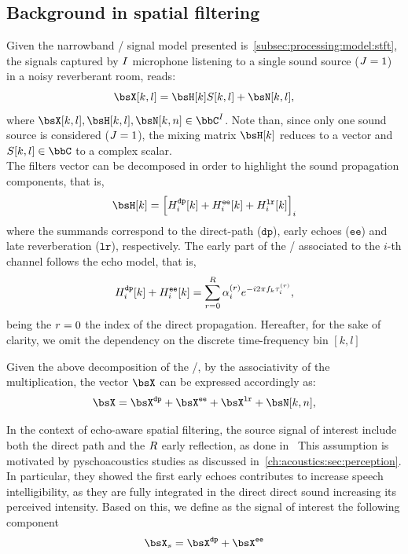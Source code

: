 \subsection{Background in spatial filtering}
Given the narrowband \STFT/ signal model presented is~\cref{subsec:processing:model:stft}, the signals captured by $I$ microphone listening to a single sound source ($J=1$) in a noisy reverberant room, reads:
\begin{equation}
    \MICS[k,l] = \FLTS[k] \SRC[k, l]+ \NSES[k,l]
    ,
\end{equation}
where $\MICS[k,l], \FLTS[k,l], \NSES[k,n] \in \bbC^{\numMics}$.
Note than, since only one sound source is considered ($J=1$), the mixing matrix $\FLTS[k]$ reduces to a vector and $\SRC[k,l] \in \bbC$ to a complex scalar.
\\The filters vector can be decomposed in order to highlight the sound propagation components, that is,
\begin{equation}
    \FLTS[k] = \kbracket{\FLT^{\mathtt{dp}}_{\idxMic}[k]+ \FLT^{\mathtt{ee}}_{\idxMic}[k] + \FLT^{\mathtt{lr}}_{\idxMic}[k] }_\idxMic
\end{equation}
where the summands correspond to the direct-path ($\mathtt{dp}$), early echoes ($\mathtt{ee}$) and late reverberation ($\mathtt{lr}$), respectively.
The early part of the \RIR/ associated to the $i$-th channel follows the echo model, that is,
\begin{equation}
    H^{\mathtt{dp}}_{i}[k]+ H^{\mathtt{ee}}_{i}[k] = \sum_{r=0}^{R} \alpha_{i}^{(r)} {e}^{-{i} 2 \pi f_k \tau_i^{(r)}}
    ,
\end{equation}
being the $r=0$ the index of the direct propagation.
Hereafter, for the sake of clarity, we omit the dependency on the discrete time-frequency bin $[k,l]$

\mynewline
Given the above decomposition of the \RIRs/, by the associativity of the multiplication, the vector $\MICS$ can be expressed accordingly as:
\begin{equation}\label{eq:dechorateapp:mics}
    \MICS = \MICS^{\mathtt{dp}} + \MICS^{\mathtt{ee}} + \MICS^{\mathtt{lr}} + \NSES[k,n]
    ,
\end{equation}

\mynewline
In the context of echo-aware spatial filtering, the source signal of interest include both the direct path and the $R$ early reflection, as done in~
This assumption is motivated by pyschoacoustics studies as discussed in~\cref{ch:acoustics:sec:perception}.
In particular, they showed the first early echoes contributes to increase speech intelligibility, as they are fully integrated in the direct direct sound increasing its perceived intensity.
Based on this, we define as the signal of interest the following component
\begin{equation}
    \MICS_s = \MICS^{\mathtt{dp}} + \MICS^{\mathtt{ee}}
\end{equation}


